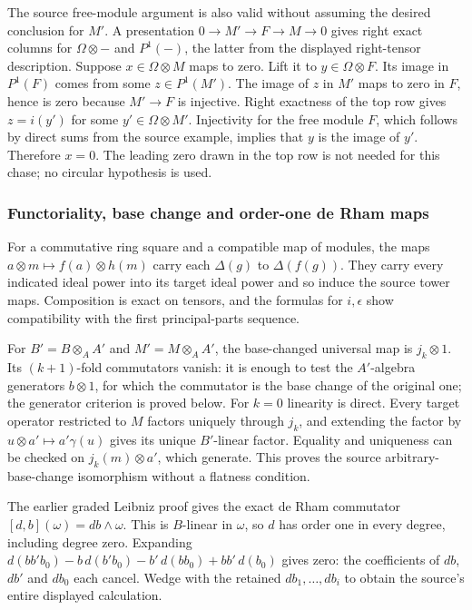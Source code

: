 The source free-module argument is also valid without assuming the desired conclusion for \(M'\). A presentation \(0\to M'\to F\to M\to0\) gives right exact columns for \(\Omega\otimes-\) and \(P^1(-)\), the latter from the displayed right-tensor description. Suppose \(x\in\Omega\otimes M\) maps to zero. Lift it to \(y\in\Omega\otimes F\). Its image in \(P^1(F)\) comes from some \(z\in P^1(M')\). The image of \(z\) in \(M'\) maps to zero in \(F\), hence is zero because \(M'\to F\) is injective. Right exactness of the top row gives \(z=i(y')\) for some \(y'\in\Omega\otimes M'\). Injectivity for the free module \(F\), which follows by direct sums from the source example, implies that \(y\) is the image of \(y'\). Therefore \(x=0\). The leading zero drawn in the top row is not needed for this chase; no circular hypothesis is used.

\subsubsection{Functoriality, base change and order-one de Rham maps}\label{algebra-proof-043-functoriality-base-change-and-order-one-de-rham-maps}

For a commutative ring square and a compatible map of modules, the maps \(a\otimes m\mapsto f(a)\otimes h(m)\) carry each \(\Delta(g)\) to \(\Delta(f(g))\). They carry every indicated ideal power into its target ideal power and so induce the source tower maps. Composition is exact on tensors, and the formulas for \(i,\epsilon\) show compatibility with the first principal-parts sequence.

For \(B'=B\otimes_A A'\) and \(M'=M\otimes_A A'\), the base-changed universal map is \(j_k\otimes1\). Its \((k+1)\)-fold commutators vanish: it is enough to test the \(A'\)-algebra generators \(b\otimes1\), for which the commutator is the base change of the original one; the generator criterion is proved below. For \(k=0\) linearity is direct. Every target operator restricted to \(M\) factors uniquely through \(j_k\), and extending the factor by \(u\otimes a'\mapsto a'\gamma(u)\) gives its unique \(B'\)-linear factor. Equality and uniqueness can be checked on \(j_k(m)\otimes a'\), which generate. This proves the source arbitrary-base-change isomorphism without a flatness condition.

The earlier graded Leibniz proof gives the exact de Rham commutator \([d,b](\omega)=db\wedge\omega\). This is \(B\)-linear in \(\omega\), so \(d\) has order one in every degree, including degree zero. Expanding \(d(bb'b_0)-b\,d(b'b_0)-b'\,d(bb_0)+bb'\,d(b_0)\) gives zero: the coefficients of \(db\), \(db'\) and \(db_0\) each cancel. Wedge with the retained \(db_1,\ldots,db_i\) to obtain the source's entire displayed calculation.

